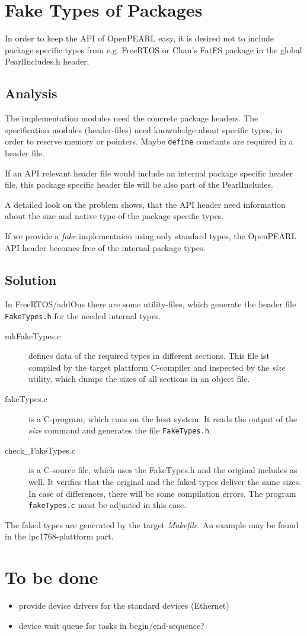 \section{Fake Types of Packages}
In order to keep the API of OpenPEARL easy, it is desired not to include
package specific types from e.g. FreeRTOS or Chan's FatFS package 
in the global PearlIncludes.h header.

\subsection{Analysis}
The implementation modules need the concrete package headers.
The specification modules (header-files) need knownledge about 
specific types, in order to reserve memory or pointers. 
Maybe \verb|define| constants are required in a header file.

If an API relevant header file would include an internal package specific
header file, this package specific header file will be also part of 
the PearlIncludes. 

A detailed look on the problem shows, that the API header need 
information about the size and native type of the package specific types.

If we provide a {\em fake} implementaion using only standard types,
the OpenPEARL API header becomes free of the internal package types.

\subsection{Solution}
In FreeRTOS/addOns there are some utility-files, which generate the header file 
\verb|FakeTypes.h| for the needed internal types.

\begin{description}
\item[mkFakeTypes.c] defines data of the required types in different sections.
This file ist compiled by the target plattform C-compiler and inspected by
the {\em size} utility, which dumps the sizes of all sections in an object file.
\item[fakeTypes.c] is a C-program, which runs on the host system. It reads
the output of the {\em size} command and generates the file \verb|FakeTypes.h|.
\item[check\_FakeTypes.c] is a C-source file, which uses the FakeTypes.h and 
the original includes as well. It verifies that the original and
the faked types deliver the same sizes. In case of differences, there will be
some compilation errors. The program \verb|fakeTypes.c| must be adjusted
in this case.
\end{description}

The faked types are generated by the target {\em Makefile}.
An example may be found in the lpc1768-plattform part.

\section{To be done}
  \begin{itemize}
  \item provide device drivers for the standard devices (Ethernet)
  \item device wait queue for tasks in begin/end-sequence?
  \end{itemize}



